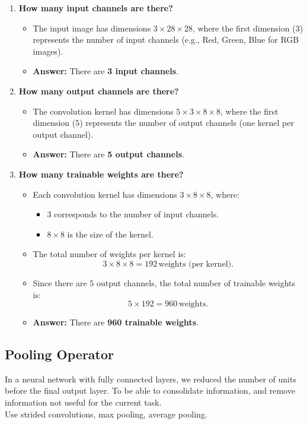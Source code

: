 \documentclass[11pt, english]{article}
\begin{document}
\begin{enumerate}
    \item \textbf{How many input channels are there?}
    \begin{itemize}
        \item The input image has dimensions $3 \times 28 \times 28$, where the first dimension ($3$) represents the number of input channels (e.g., Red, Green, Blue for RGB images).
        \item \textbf{Answer:} There are \textbf{3 input channels}.
    \end{itemize}

    \item \textbf{How many output channels are there?}
    \begin{itemize}
        \item The convolution kernel has dimensions $5 \times 3 \times 8 \times 8$, where the first dimension ($5$) represents the number of output channels (one kernel per output channel).
        \item \textbf{Answer:} There are \textbf{5 output channels}.
    \end{itemize}

    \item \textbf{How many trainable weights are there?}
    \begin{itemize}
        \item Each convolution kernel has dimensions $3 \times 8 \times 8$, where:
        \begin{itemize}
            \item $3$ corresponds to the number of input channels.
            \item $8 \times 8$ is the size of the kernel.
        \end{itemize}
        \item The total number of weights per kernel is:
        \[
        3 \times 8 \times 8 = 192 \, \text{weights (per kernel)}.
        \]
        \item Since there are $5$ output channels, the total number of trainable weights is:
        \[
        5 \times 192 = 960 \, \text{weights}.
        \]
        \item \textbf{Answer:} There are \textbf{960 trainable weights}.
    \end{itemize}
\end{enumerate}
\subsection{Pooling Operator}
In a neural network with fully connected layers, we reduced the number of units before the final output layer. To be able to consolidate information, and remove information not useful for the current task.\\
Use strided convolutions, max pooling, average pooling.
\end{document}
